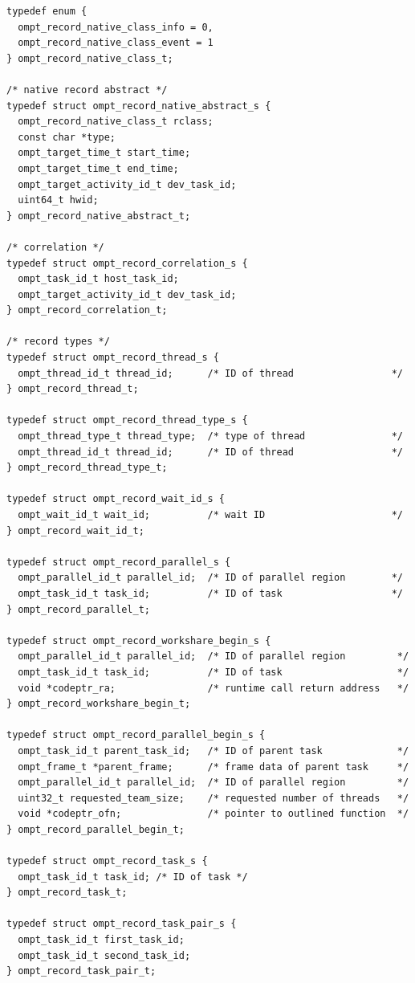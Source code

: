 \documentclass{article}
\begin{document}
{\begin{verbatim}
typedef enum {
  ompt_record_native_class_info = 0,
  ompt_record_native_class_event = 1
} ompt_record_native_class_t;

/* native record abstract */
typedef struct ompt_record_native_abstract_s {
  ompt_record_native_class_t rclass;
  const char *type;
  ompt_target_time_t start_time;
  ompt_target_time_t end_time;
  ompt_target_activity_id_t dev_task_id;
  uint64_t hwid;
} ompt_record_native_abstract_t;

/* correlation */
typedef struct ompt_record_correlation_s {
  ompt_task_id_t host_task_id;         
  ompt_target_activity_id_t dev_task_id;
} ompt_record_correlation_t;

/* record types */
typedef struct ompt_record_thread_s {
  ompt_thread_id_t thread_id;      /* ID of thread                 */
} ompt_record_thread_t;

typedef struct ompt_record_thread_type_s {
  ompt_thread_type_t thread_type;  /* type of thread               */
  ompt_thread_id_t thread_id;      /* ID of thread                 */
} ompt_record_thread_type_t;

typedef struct ompt_record_wait_id_s {
  ompt_wait_id_t wait_id;          /* wait ID                      */
} ompt_record_wait_id_t;

typedef struct ompt_record_parallel_s {
  ompt_parallel_id_t parallel_id;  /* ID of parallel region        */
  ompt_task_id_t task_id;          /* ID of task                   */
} ompt_record_parallel_t;

typedef struct ompt_record_workshare_begin_s {
  ompt_parallel_id_t parallel_id;  /* ID of parallel region         */
  ompt_task_id_t task_id;          /* ID of task                    */
  void *codeptr_ra;                /* runtime call return address   */
} ompt_record_workshare_begin_t;

typedef struct ompt_record_parallel_begin_s {
  ompt_task_id_t parent_task_id;   /* ID of parent task             */
  ompt_frame_t *parent_frame;      /* frame data of parent task     */
  ompt_parallel_id_t parallel_id;  /* ID of parallel region         */
  uint32_t requested_team_size;    /* requested number of threads   */
  void *codeptr_ofn;               /* pointer to outlined function  */
} ompt_record_parallel_begin_t;

typedef struct ompt_record_task_s {
  ompt_task_id_t task_id; /* ID of task */
} ompt_record_task_t;

typedef struct ompt_record_task_pair_s {
  ompt_task_id_t first_task_id; 
  ompt_task_id_t second_task_id;  
} ompt_record_task_pair_t;


\end{verbatim}}
\end{document}
